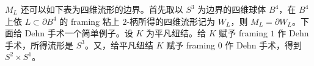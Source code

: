 $M_L$ 还可以如下表为四维流形的边界。首先取以 $S^3$ 为边界的四维球体 $B^4$，在 $B^4$ 上依 $L\subset\partial B^4$ 的 framing 粘上 $2$-柄所得的四维流形记为 $W_L$，则 $M_L=\partial W_L$。下面给 Dehn 手术一个简单例子。设 $K$ 为平凡纽结。给 $K$ 赋予 framing $1$ 作 Dehn 手术，所得流形是 $S^3$。又，给平凡纽结 $K$ 赋予 framing $0$ 作 Dehn 手术，得到 $S^2\times S^1$。




